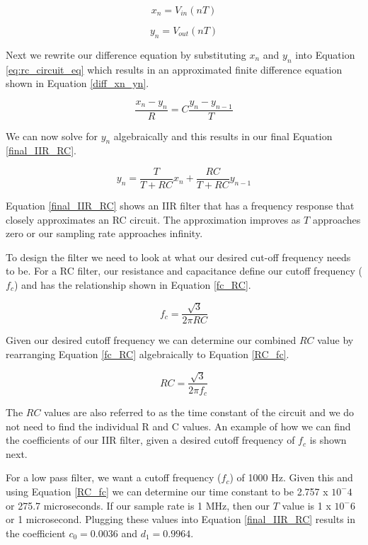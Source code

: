 \begin{equation}\label{input_IIR}
x_n=V_{in}(nT)
\end{equation}

\begin{equation}\label{output_IIR}
y_n=V_{out}(nT)
\end{equation}

Next we rewrite our difference equation by substituting $x_n$ and $y_n$ into Equation \ref{eq:rc_circuit_eq} which results in an approximated finite difference equation shown in Equation \ref{diff_xn_yn}.

\begin{equation}\label{diff_xn_yn}
\frac{x_n-y_n}{R}=C\frac{y_n-y_{n-1}}{T}
\end{equation}

We can now solve for $y_n$ algebraically and this results in our final Equation \ref{final_IIR_RC}.

\begin{equation}\label{final_IIR_RC}
y_n=\frac{T}{T+RC}x_n+\frac{RC}{T+RC}y_{n-1}
\end{equation}

Equation \ref{final_IIR_RC} shows an IIR filter that has a frequency response that closely approximates an RC circuit.  The approximation improves as $T$ approaches zero or our sampling rate approaches infinity.

To design the filter we need to look at what our desired cut-off frequency needs to be.  For a RC filter, our resistance and capacitance define our cutoff frequency ($f_c$) and has the relationship shown in Equation \ref{fc_RC}.

\begin{equation}\label{fc_RC}
f_c=\frac{\sqrt{3}}{2\pi RC}
\end{equation}

Given our desired cutoff frequency we can determine our combined $RC$ value by rearranging Equation \ref{fc_RC} algebraically to Equation \ref{RC_fc}.

\begin{equation}\label{RC_fc}
RC=\frac{\sqrt{3}}{2\pi f_c}
\end{equation}

The $RC$ values are also referred to as the time constant of the circuit and we do not need to find the individual R and C values.  An example of how we can find the coefficients of our IIR filter, given a desired cutoff frequency of $f_c$ is shown next.  

For a low pass filter, we want a cutoff frequency ($f_c$) of 1000 Hz.  Given this and using Equation \ref{RC_fc} we can determine our time constant to be 2.757 x $10^-4$ or 275.7 microseconds.  If our sample rate is 1 MHz, then our $T$ value is 1 x $10^-6$ or 1 microsecond.  Plugging these values into Equation \ref{final_IIR_RC} results in the coefficient $c_0 = 0.0036$ and $d_1=0.9964$.  

